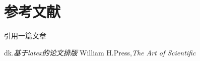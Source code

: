 \documentclass[UTF8]{article}
\date{\today}
\begin{document}
	\section{参考文献}
	
	引用一篇文章\cite{article1}
	\begin{thebibliography}{99}

		 dk.\emph{基于latex的论文排版}
		 William H.Press,\emph{The Art of Scientific}

	\end{thebibliography}

	
	
	
\end{document}
